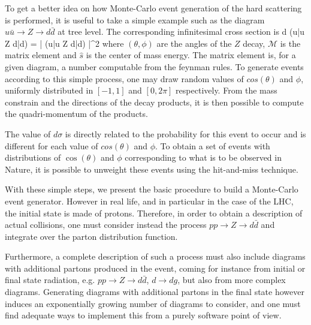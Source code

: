             To get a better idea on how Monte-Carlo event generation of the hard scattering
            is performed, it is useful to take a simple example such as the diagram
            $u\bar{u} \rightarrow Z \rightarrow d\bar{d}$ at tree level. The corresponding
            infinitesimal cross section is
            {
                d \sigma(u\bar{u} \rightarrow Z \rightarrow d\bar{d})
                =
                \left|
                    (u\bar{u} \rightarrow Z \rightarrow d\bar{d})
                \right|^2
            }
            where $(\theta,\phi)$ are the angles of the $Z$ decay, $\mathcal{M}$
            is the matrix element and $\hat{s}$ is the center of mass energy. The matrix
            element is, for a given diagram, a number computable from the feynman rules.
            To generate events according to this simple process, one may draw random
            values of $cos(\theta)$ and $\phi$, uniformly distributed in $[-1, 1]$ and
            $[0,2\pi]$ respectively. From the mass constrain and the directions of the
            decay products, it is then possible to compute the quadri-momentum of the products.

            The value of $d\sigma$ is directly related to the probability for this event
            to occur and is different for each value of $cos(\theta)$ and $\phi$. To obtain
            a set of events with distributions of $\cos(\theta)$ and $\phi$ corresponding to
            what is to be observed in Nature, it is possible to unweight these events using
            the hit-and-miss technique.

            With these simple steps, we present the basic procedure to build a Monte-Carlo
            event generator. However in real life, and in particular in the case of the
            LHC, the initial state is made of protons. Therefore, in order to obtain a
            description of actual collisions, one must consider instead the process
            $pp \rightarrow Z \rightarrow d\bar{d}$ and integrate over the parton distribution
            function.

            Furthermore, a complete description of such a process must also include
            diagrams with additional partons produced in the event, coming for instance
            from initial or final state radiation, e.g. $pp \rightarrow Z \rightarrow
            d\bar{d}$, $d\rightarrow dg$, but also from more complex diagrams. Generating
            diagrams with additional partons in the final state however induces an exponentially growing
            number of diagrams to consider, and one must find adequate ways to implement
            this from a purely software point of view.

